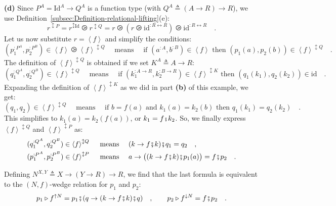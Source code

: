 \textbf{(d)} Since $P^{A}=\text{Id}^{A}\rightarrow Q^{A}$ is a function
type (with $Q^{A}\triangleq\left(A\rightarrow R\right)\rightarrow R$),
we use Definition~\ref{subsec:Definition-relational-lifting}(e):
\[
r^{\updownarrow P}=r^{\updownarrow\text{Id}}\ogreaterthan r^{\updownarrow Q}=r\ogreaterthan(r\ogreaterthan\text{id}^{:R\leftrightarrow R})\ogreaterthan\text{id}^{:R\leftrightarrow R}\quad.
\]
Let us now substitute $r=\left<f\right>$ and simplify the conditions:
\[
(p_{1}^{:P^{A}},p_{2}^{:P^{B}})\in\left<f\right>\ogreaterthan\left<f\right>^{\updownarrow Q}\quad\text{ means }\quad\text{if }(a^{:A},b^{:B})\in\left<f\right>\text{ then }(p_{1}(a),p_{2}(b))\in\left<f\right>^{\updownarrow Q}\quad.
\]
The definition of $\left<f\right>^{\updownarrow Q}$ is obtained if
we set $K^{A}\triangleq A\rightarrow R$:
\[
(q_{1}^{:Q^{A}},q_{2}^{:Q^{B}})\in\left<f\right>^{\updownarrow Q}\quad\text{ means }\quad\text{if }(k_{1}^{:A\rightarrow R},k_{2}^{:B\rightarrow R})\in\left<f\right>^{\updownarrow K}\text{ then }(q_{1}(k_{1}),q_{2}(k_{2}))\in\text{id}\quad.
\]
Expanding the definition of $\left<f\right>^{\updownarrow K}$ as
we did in part \textbf{(b)} of this example, we get:
\[
(q_{1},q_{2})\in\left<f\right>^{\updownarrow Q}\quad\text{ means }\quad\text{if }b=f(a)\text{ and }k_{1}(a)=k_{2}(b)\text{ then }q_{1}(k_{1})=q_{2}(k_{2})\quad.
\]
This simplifies to $k_{1}(a)=k_{2}(f(a))$, or $k_{1}=f\bef k_{2}$.
So, we finally express $\left<f\right>^{\updownarrow Q}$ and $\left<f\right>^{\updownarrow P}$
as:
\begin{align*}
 & (q_{1}^{:Q^{A}},q_{2}^{:Q^{B}})\in\left<f\right>^{\updownarrow Q}\quad\text{ means }\quad(k\rightarrow f\bef k)\bef q_{1}=q_{2}\quad,\\
 & (p_{1}^{:P^{A}},p_{2}^{:P^{B}})\in\left<f\right>^{\updownarrow P}\quad\text{ means }\quad a\rightarrow\big((k\rightarrow f\bef k)\bef p_{1}(a)\big)=f\bef p_{2}\quad.
\end{align*}

Defining $N^{X,Y}\triangleq X\rightarrow\left(Y\rightarrow R\right)\rightarrow R$,
we find that the last formula is equivalent to the $\left(N,f\right)$-wedge
relation for $p_{1}$ and $p_{2}$:
\[
p_{1}\triangleright f^{\uparrow N}=p_{1}\bef(q\rightarrow(k\rightarrow f\bef k)\bef q)\quad,\quad\quad p_{2}\triangleright f^{\downarrow N}=f\bef p_{2}\quad.
\]

